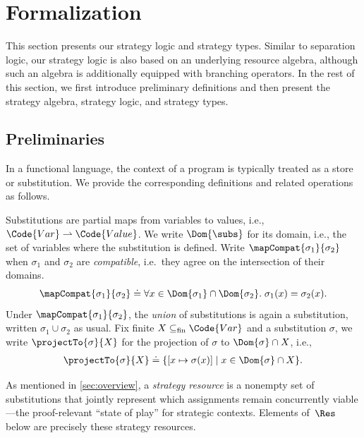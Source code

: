 \section{Formalization}\label{sec:formal}

This section presents our strategy logic and strategy types. Similar to separation logic, our strategy logic is also based on an underlying resource algebra, although such an algebra is additionally equipped with branching operators. In the rest of this section, we first introduce preliminary definitions and then present the strategy algebra, strategy logic, and strategy types.

\subsection{Preliminaries}

In a functional language, the context of a program is typically treated as a store or substitution. We provide the corresponding definitions and related operations as follows.

\begin{definition}[Substitution]\label{def:subst-compat}
  Substitutions are partial maps from variables to values, i.e., $\Code{Var} \rightharpoonup \Code{Value}$. We write $\Dom{\subs}$ for its domain, i.e., the set of variables where the substitution is defined.
  Write $\mapCompat{\sigma_1}{\sigma_2}$ when $\sigma_1$ and $\sigma_2$ are
  \emph{compatible}, i.e.\ they agree on the intersection of their domains.
  \[
    \mapCompat{\sigma_1}{\sigma_2}
    \doteq
    \forall x \in \Dom{\sigma_1} \cap \Dom{\sigma_2}.\; \sigma_1(x) = \sigma_2(x).
  \]
  Under $\mapCompat{\sigma_1}{\sigma_2}$, the \emph{union} of substitutions is again a substitution, written $\sigma_1 \cup \sigma_2$ as usual. Fix finite $X \subseteq_{\mathrm{fin}} \Code{Var}$ and a substitution $\sigma$, we write $\projectTo{\sigma}{X}$ for the projection of $\sigma$ to $\Dom{\sigma} \cap X$, i.e.,
  \begin{align*}
    \projectTo{\sigma}{X} \doteq \{ [x\mapsto \sigma(x)] \mid x \in \Dom{\sigma} \cap X \}.
  \end{align*}
 \end{definition}

 As mentioned in \autoref{sec:overview}, a \emph{strategy resource} is a nonempty set of substitutions that jointly represent which assignments remain concurrently viable---the proof-relevant ``state of play'' for strategic contexts. Elements of~\(\Res\) below are precisely these strategy resources.

